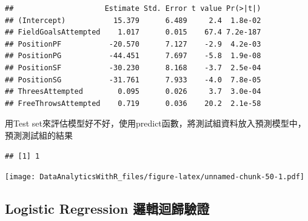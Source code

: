 \documentclass[]{book}
\newenvironment{Shaded}{\begin{snugshade}}{\end{snugshade}}
\newcommand{\CommentTok}[1]{\textcolor[rgb]{0.56,0.35,0.01}{\textit{#1}}}
\newcommand{\DataTypeTok}[1]{\textcolor[rgb]{0.13,0.29,0.53}{#1}}
\newcommand{\KeywordTok}[1]{\textcolor[rgb]{0.13,0.29,0.53}{\textbf{#1}}}
\newcommand{\NormalTok}[1]{#1}
\newcommand{\OperatorTok}[1]{\textcolor[rgb]{0.81,0.36,0.00}{\textbf{#1}}}
\begin{document}
\begin{verbatim}
##                     Estimate Std. Error t value Pr(>|t|)
## (Intercept)           15.379      6.489     2.4  1.8e-02
## FieldGoalsAttempted    1.017      0.015    67.4 7.2e-187
## PositionPF           -20.570      7.127    -2.9  4.2e-03
## PositionPG           -44.451      7.697    -5.8  1.9e-08
## PositionSF           -30.230      8.168    -3.7  2.5e-04
## PositionSG           -31.761      7.933    -4.0  7.8e-05
## ThreesAttempted        0.095      0.026     3.7  3.0e-04
## FreeThrowsAttempted    0.719      0.036    20.2  2.1e-58
\end{verbatim}

用Test set來評估模型好不好，使用predict函數，將測試組資料放入預測模型中，預測測試組的結果

\begin{Shaded}
\end{Shaded}

\begin{verbatim}
## [1] 1
\end{verbatim}

\begin{Shaded}
\end{Shaded}

\texttt{[image: DataAnalyticsWithR\_files/figure-latex/unnamed-chunk-50-1.pdf]}

\hypertarget{logistic-regression-ux908fux8f2fux8ff4ux6b78ux9a57ux8b49}{%
\subsection{Logistic Regression 邏輯迴歸驗證}\label{logistic-regression-ux908fux8f2fux8ff4ux6b78ux9a57ux8b49}}
\end{document}
